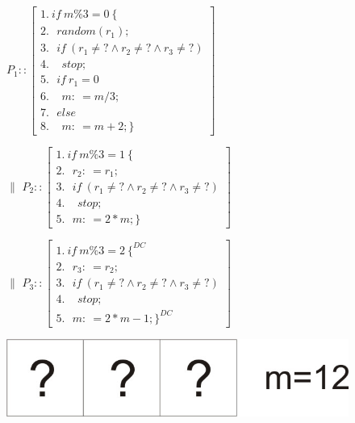 \begin{frame}
\begin{figure}[hbt]
\begin{center}
{\begin{minipage}[b]{10cm}
{\vspace{4mm}
\parbox[t]{5cm}
{%
$P_1::\left[\begin{array}{l}
              1.\ if\ m\%3=0\ \{\\
              2.\ \ \ random(r_1); \\
              3.\ \ \ if\ (r_1\neq ?\wedge r_2\neq ?\wedge r_3\neq ?) \\
              4.\ \ \ \ \ stop; \\
              5.\ \ \ if\ r_1=0 \\
              6.\ \ \ \ \ m:\ = m/3; \\
              7.\ \ \ else \\
              8.\ \ \ \ \ m:\ =m+2; \}
            \end{array}
      \right]$}
$\parallel$
{%
$P_2::\left[\begin{array}{l}
              1.\ if\ m\%3=1\ \{ \\
              2.\ \ \ r_2:\ =r_1; \\
              3.\ \ \ if\ (r_1\neq ?\wedge r_2\neq ?\wedge r_3\neq ?) \\
              4.\ \ \ \ \ stop; \\
              5.\ \ \ m:\ = 2*m; \}
             \end{array}
      \right]$} \\
\begin{center}
$\parallel$ 
{$P_3::\left[\begin{array}{l}
              1.\ if\ m\%3=2\ \{^{DC}\\
              2.\ \ \ r_3:\ = r_2; \\
              3.\ \ \ if\ (r_1\neq ?\wedge r_2\neq ?\wedge r_3\neq ?) \\
              4.\ \ \ \ \ stop; \\              
              5.\ \ \ m:\ = 2*m-1; \}^{DC}                        
              \end{array}
      \right]$}
\end{center}
}
\end{minipage}
}
\end{center}
\end{figure}

\vspace{-1.5mm}
\begin{figure}[t]
		\includegraphics{figures/SlotMach1.jpg}
\end{figure}
\end{frame}


